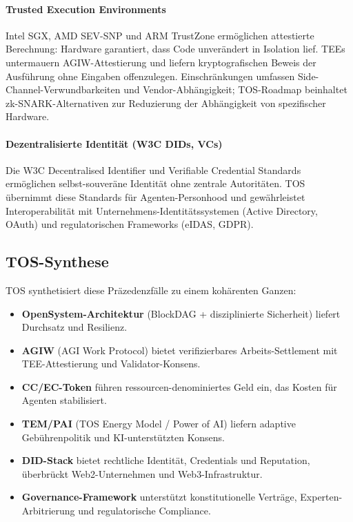 \documentclass[11pt]{article}
\begin{document}
\paragraph{Trusted Execution Environments} Intel SGX, AMD SEV-SNP und ARM TrustZone ermöglichen attestierte Berechnung: Hardware garantiert, dass Code unverändert in Isolation lief. TEEs untermauern AGIW-Attestierung und liefern kryptografischen Beweis der Ausführung ohne Eingaben offenzulegen. Einschränkungen umfassen Side-Channel-Verwundbarkeiten und Vendor-Abhängigkeit; TOS-Roadmap beinhaltet zk-SNARK-Alternativen zur Reduzierung der Abhängigkeit von spezifischer Hardware.

\paragraph{Dezentralisierte Identität (W3C DIDs, VCs)} Die W3C Decentralised Identifier und Verifiable Credential Standards ermöglichen selbst-souveräne Identität ohne zentrale Autoritäten. TOS übernimmt diese Standards für Agenten-Personhood und gewährleistet Interoperabilität mit Unternehmens-Identitätssystemen (Active Directory, OAuth) und regulatorischen Frameworks (eIDAS, GDPR).

\subsection{TOS-Synthese}
TOS synthetisiert diese Präzedenzfälle zu einem kohärenten Ganzen:
\begin{itemize}[noitemsep]
  \item \textbf{OpenSystem-Architektur} (BlockDAG + disziplinierte Sicherheit) liefert Durchsatz und Resilienz.
  \item \textbf{AGIW} (AGI Work Protocol) bietet verifizierbares Arbeits-Settlement mit TEE-Attestierung und Validator-Konsens.
  \item \textbf{CC/EC-Token} führen ressourcen-denominiertes Geld ein, das Kosten für Agenten stabilisiert.
  \item \textbf{TEM/PAI} (TOS Energy Model / Power of AI) liefern adaptive Gebührenpolitik und KI-unterstützten Konsens.
  \item \textbf{DID-Stack} bietet rechtliche Identität, Credentials und Reputation, überbrückt Web2-Unternehmen und Web3-Infrastruktur.
  \item \textbf{Governance-Framework} unterstützt konstitutionelle Verträge, Experten-Arbitrierung und regulatorische Compliance.
\end{itemize}
\end{document}
